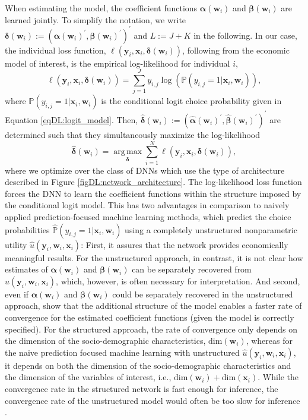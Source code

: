 \documentclass[a4paper, 12pt]{article}
\DeclareMathOperator*{\argmax}{arg\,max}
\begin{document}
When estimating the model, the coefficient functions $\bm{\alpha}(\bm{w}_i)$ and $\bm{\beta}(\bm{w}_i)$ are learned jointly. To simplify the notation, we write $\bm{\delta}(\bm{w}_i):=(\bm{\alpha}(\bm{w}_i)^{\prime}, \bm{\beta}(\bm{w}_i)^{\prime})^{\prime}$ and $L:= J+K$  in the following. In our case, the individual loss function,  $\ell\left(\bm{y}_i, \bm{x}_i, \bm{\delta}(\bm{w}_i)\right)$, following from the economic model of interest, is the empirical log-likelihood for individual $i$, 
\begin{equation}\label{eqDL:loglik}
\ell\left(\bm{y}_i, \bm{x}_i, \bm{\delta}(\bm{w}_i)\right)=\sum\limits_{j=1}^J y_{i,j}\log\left(\mathbb{P}\left(y_{i,j}=1\vert \bm{x}_i, \bm{w}_i\right)\right),
\end{equation}
where $\mathbb{P}\left(y_{i,j}=1\vert \bm{x}_i, \bm{w}_i\right)$ is the conditional logit choice probability given in Equation \eqref{eqDL:logit_model}.
Then, $\hat{\bm{\delta}}(\bm{w}_i):= (\hat{\bm{\alpha}}(\bm{w}_i)^{\prime}, \hat{\bm{\beta}}(\bm{w}_i)^{\prime})^{\prime}$ are determined such that they simultaneously maximize the log-likelihood 
\begin{equation}
\hat{\bm{\delta}}(\bm{w}_i)=\argmax\limits_{\bm{{\delta}}} \sum\limits_{i=1}^N \ell\left(\bm{y}_i, \bm{x}_i, \bm{{\delta}}(\bm{w}_i)\right),
\end{equation} 
where we optimize over the class of DNNs which use the type of architecture described in Figure \ref{figDL:network_architecture}.
The log-likelihood loss function forces the DNN to learn the coefficient functions within the structure imposed by the conditional logit model. This has two advantages in comparison to naively applied prediction-focused machine learning methods, which predict the choice probabilities $\hat{\mathbb{P}}\left(y_{i,j}=1\vert \bm{x}_i, \bm{w}_i\right)$ using a completely unstructured nonparametric utility $\hat{u}(\bm{y}_i, \bm{w}_i,\bm{x}_i)$: 
First, it assures that the network provides economically meaningful results. For the unstructured approach, in contrast, it is not clear how estimates of $\bm{\alpha}(\bm{w}_i)$ and $\bm{\beta}(\bm{w}_i)$ can be separately recovered from  $\hat{u}(\bm{y}_i, \bm{w}_i,\bm{x}_i)$, which, however, is often necessary for interpretation. And second, even if $\bm{\alpha}(\bm{w}_i)$ and $\bm{\beta}(\bm{w}_i)$ could be separately recovered in the unstructured approach,  show that the additional structure of the model enables a faster rate of convergence for the estimated coefficient functions (given the model is correctly specified). For the structured approach, the rate of convergence only depends on the dimension of the socio-demographic characteristics, $\text{dim}(\bm{w}_i)$, whereas for the naive prediction focused machine learning with  unstructured  $\hat{u}(\bm{y}_i, \bm{w}_i,\bm{x}_i)$, it depends on both the dimension of the socio-demographic characteristics and the dimension of the variables of interest, i.e., $\text{dim}(\bm{w}_i)+\text{dim}(\bm{x}_i)$. While the convergence rate in the structured network is fast enough for inference, the convergence rate of the unstructured model would often be too slow for inference \cite{farrell2020}. 
\end{document}
